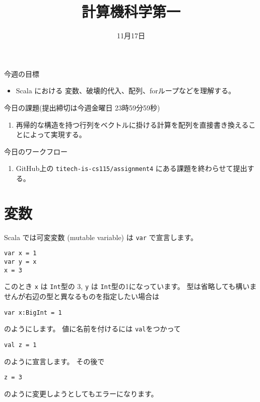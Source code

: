 \documentclass[a4paper,twoside,onecolumn,openany,article]{memoir}
\title{計算機科学第一}
\date{11月17日}
\theoremstyle{remark}
\begin{document}
\maketitle

\noindent
今週の目標
\begin{itemize}
\item Scala における 変数、破壊的代入、配列、forループなどを理解する。
\end{itemize}

\noindent
今日の課題(提出締切は今週金曜日 23時59分59秒)
\begin{enumerate}
\item 
再帰的な構造を持つ行列をベクトルに掛ける計算を配列を直接書き換えることによって実現する。
\end{enumerate}

\noindent
今日のワークフロー
\begin{enumerate}
\item GitHub上の \verb|titech-is-cs115/assignment4| にある課題を終わらせて提出する。
\end{enumerate}

\section{変数}
Scala では可変変数 (mutable variable) は \texttt{var} で宣言します。
\begin{verbatim}
var x = 1
var y = x
x = 3
\end{verbatim}
このとき \texttt{x} は \texttt{Int}型の 3,  \texttt{y} は \texttt{Int}型の1になっています。
型は省略しても構いませんが右辺の型と異なるものを指定したい場合は
\begin{verbatim}
var x:BigInt = 1
\end{verbatim}
のようにします。
値に名前を付けるには \texttt{val}をつかって
\begin{verbatim}
val z = 1
\end{verbatim}
のように宣言します。
その後で
\begin{verbatim}
z = 3
\end{verbatim}
のように変更しようとしてもエラーになります。
\end{document}
